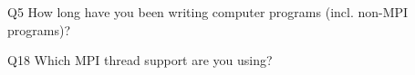 \begin{description}%
\item{Q5} How long have you been writing computer programs (incl. non-MPI programs)?%
\item{Q18} Which MPI thread support are you using?%
\end{description}%

